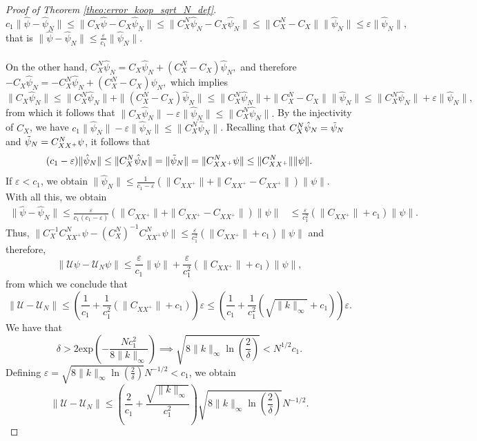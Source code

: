 \documentclass{article}
\newcommand{\U}{\mathcal{U}}
\begin{document}
\begin{proof}[Proof of Theorem \ref{theo:error_koop_sqrt_N_def}]
\[
c_1 \| \hat{\psi} - \hat{\psi}_N \| \leq  \| C_X \hat{\psi} - C_X \hat{\psi}_N \| \leq \| C_X^N \hat{\psi}_N - C_X \hat{\psi}_N \| \leq \| C_X^N - C_X\| \| \hat{\psi}_N \| \leq \varepsilon \| \hat{\psi}_N \|,
\]
that is \(\displaystyle \| \hat{\psi} - \hat{\psi}_N \| \leq \frac{\varepsilon}{c_1} \| \hat{\psi}_N \|.\)
\\
\\
On the other hand, \(C_X^N \hat{\psi}_N = C_X \hat{\psi}_N + (C_X^N - C_X) \hat{\psi}_N,\) and therefore \(-C_X \hat{\psi}_N = -C_X^N \hat{\psi}_N + (C_X^N - C_X) \hat{\psi}_N,\) which implies  
\[
\| C_X \hat{\psi}_N \| \leq \| C_X^N \hat{\psi}_N \| + \| (C_X^N - C_X) \hat{\psi}_N \| \leq \| C_X^N \hat{\psi}_N \|+ \| C_X^N - C_X \| \| \hat{\psi}_N \| \leq \| C_X^N \hat{\psi}_N \| + 
\varepsilon \| \hat{\psi}_N \|,
\]
from which it follows that \(\| C_X \hat{\psi}_N \| - \varepsilon \| \hat{\psi}_N \| \leq \| C_X^N \hat{\psi}_N \|.\) By the injectivity of \( C_X \), we have \(c_1 \| \hat{\psi}_N \| - \varepsilon \| \hat{\psi}_N \|  \leq \| C_X^N \hat{\psi}_N \|\).
Recalling that \( C_X^N \hat{\psi}_N = \Tilde{\psi}_N \) and \( \Tilde{\psi}_N = C_{XX^+}^N \psi \), it follows that  
\[
(c_1 - \varepsilon) \| \hat{\psi}_N \| \leq \| C_X^N \hat{\psi}_N \| = \| \Tilde{\psi}_N \| = \| C_{XX^+}^N \psi \| \leq \| C_{XX^+}^N \| \| \psi \|.
\]
If \( \varepsilon < c_1 \), we obtain \(\displaystyle \| \hat{\psi}_N \| \leq \frac{1}{c_1 - \varepsilon}
(\| C_{XX^+} \| + \| C_{XX^+} - C_{XX^+} \| ) \| \psi \|\). With all this, we obtain  
\[
\begin{aligned}
    \| \hat{\psi} - \hat{\psi}_N \| \leq \frac{\varepsilon}{c_1(c_1 - \varepsilon)}
(\| C_{XX^+} \| + \| C_{XX^+} - C_{XX^+} \| ) \| \psi \| & \leq \frac{\varepsilon}{c_1^2}
(\| C_{XX^+} \| + c_1 ) \| \psi \|.
\end{aligned}
\]
Thus, \(\displaystyle \| C_X^{-1} C_{XX^+}^N \psi - \left (C_X^N \right )^{-1} C_{XX^+}^N \psi \| \leq \frac{\varepsilon}{c_1^2}
(\| C_{XX^+} \| + c_1 ) \| \psi \|\) and therefore,  
\[
\| \U \psi - \U_N \psi \| \leq \frac{\varepsilon}{c_1} \| \psi \| + \frac{\varepsilon}{c_1^2}
(\| C_{XX^+} \| + c_1 ) \| \psi \|,
\]
from which we conclude that  
\[
\| \U - \U_N \| \leq \left ( \frac{1}{c_1} + \frac{1}{c_1^2}
(\| C_{XX^+} \| + c_1 ) \right ) \varepsilon \leq \left ( \frac{1}{c_1} + \frac{1}{c_1^2}
(\sqrt{\| k \|_{\infty}} + c_1 ) \right ) \varepsilon.
\]
We have that 
\[
\delta > 2\text{exp} \left ( - \frac{N c_1^2}{8 \| k \|_\infty} \right ) \implies \sqrt{8 \| k \|_{\infty} \ln \left ( \frac{2}{\delta} \right )} < N^{1/2} c_1.
\]
Defining \(\varepsilon = \sqrt{8 \| k \|_{\infty} \ln \left ( \frac{2}{\delta} \right )} N^{-1/2} < c_1 \), we obtain  
\[
\| \U - \U_N \| \leq \left ( \frac{2}{c_1} + \frac{\sqrt{\| k \|_{\infty}}}{c_1^2}
  \right )\sqrt{8 \| k \|_\infty \ln \left ( \frac{2}{\delta}\right ) } N^{-1/2}.
\]
\end{proof}
\end{document}
